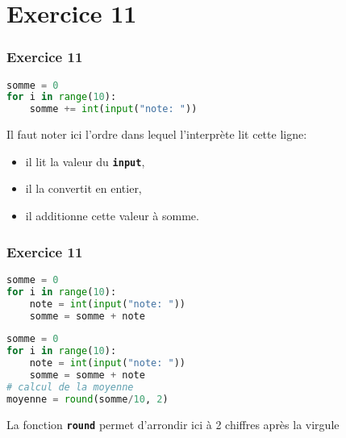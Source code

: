 \documentclass[svgnames,11pt]{beamer}
\begin{document}
\section{Exercice 11}
\begin{frame}[fragile]
    \frametitle{Exercice 11}

\begin{center}
\begin{lstlisting}[language=Python , basicstyle=\ttfamily\small, xleftmargin=1em, xrightmargin=1em]
somme = 0
for i in range(10):
    somme += int(input("note: "))
\end{lstlisting}
\label{CODE}
\end{center}
\begin{aretenir}[Remarque]
    Il faut noter ici l'ordre dans lequel l'interprète
    lit cette ligne:
\begin{itemize}
    \item il lit la valeur du \texttt{\textbf{input}},
    \item il la convertit en entier,
    \item il additionne cette valeur à somme.
\end{itemize}
\end{aretenir}
\end{frame}
\begin{frame}[fragile]
    \frametitle{Exercice 11}

\begin{center}
\begin{lstlisting}[language=Python , basicstyle=\ttfamily\small, xleftmargin=1em, xrightmargin=1em]
somme = 0
for i in range(10):
    note = int(input("note: "))
    somme = somme + note
\end{lstlisting}
\label{CODE}
\end{center}
\end{frame}
\begin{frame}[fragile]
\begin{center}
\begin{lstlisting}[language=Python , basicstyle=\ttfamily\small, xleftmargin=1em, xrightmargin=1em]
somme = 0
for i in range(10):
    note = int(input("note: "))
    somme = somme + note
# calcul de la moyenne
moyenne = round(somme/10, 2)
\end{lstlisting}
\label{CODE}
\end{center}
\begin{aretenir}[Remarque]
    La fonction \texttt{\textbf{round}} permet d'arrondir
    ici à 2 chiffres après la virgule
\end{aretenir}
\end{frame}
\end{document}
